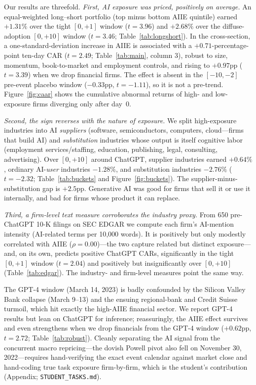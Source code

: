 \documentclass[12pt]{article}
\newcommand{\edgarnfirms}{650}\newcommand{\edgarcorr}{0.00}\newcommand{\edgarshare}{0}}
\begin{document}
Our results are threefold. \emph{First, AI exposure was priced, positively on average.}
An equal-weighted long--short portfolio (top minus bottom AIIE quintile) earned
$+1.31\%$ over the tight $[0,+1]$ window ($t=3.96$) and $+2.68\%$ over the
diffuse-adoption $[0,+10]$ window ($t=3.46$; Table~\ref{tab:longshort}). In the
cross-section, a one-standard-deviation increase in AIIE is associated with a
$+0.71$-percentage-point ten-day CAR ($t=2.49$; Table~\ref{tab:main}, column 3),
robust to size, momentum, book-to-market and employment controls, and rising to
$+0.97$pp ($t=3.39$) when we drop financial firms. The effect is absent in the
$[-10,-2]$ pre-event placebo window ($-0.33$pp, $t=-1.11$), so it is not a pre-trend.
Figure~\ref{fig:caar} shows the cumulative abnormal returns of high- and low-exposure
firms diverging only after day~0.

\emph{Second, the sign reverses with the nature of exposure.} We split high-exposure
industries into AI \emph{suppliers} (software, semiconductors, computers, cloud---firms
that build AI) and \emph{substitution} industries whose output is itself cognitive
labor (employment services/staffing, education, publishing, legal, consulting,
advertising). Over $[0,+10]$ around ChatGPT, supplier industries earned $+0.64\%$,
ordinary AI-\emph{user} industries $-1.28\%$, and substitution industries $-2.76\%$
($t=-2.32$; Table~\ref{tab:buckets} and Figure~\ref{fig:buckets}). The supplier-minus-
substitution gap is $+2.5$pp. Generative AI was good for firms that sell it or use it
internally, and bad for firms whose product it can replace.

\emph{Third, a firm-level text measure corroborates the industry proxy.} From
\edgarnfirms{} pre-ChatGPT 10-K filings on SEC EDGAR we compute each firm's AI-mention
intensity (AI-related terms per 10{,}000 words). It is positively but only modestly
correlated with AIIE ($\rho=\edgarcorr$)---the two capture related but distinct
exposure---and, on its own, predicts positive ChatGPT CARs, significantly in the tight
$[0,+1]$ window ($t=2.04$) and positively but insignificantly over $[0,+10]$
(Table~\ref{tab:edgar}). The industry- and firm-level measures point the same way.

The GPT-4 window (March 14, 2023) is badly confounded by the Silicon Valley Bank
collapse (March 9--13) and the ensuing regional-bank and Credit Suisse turmoil, which
hit exactly the high-AIIE financial sector. We report GPT-4 results but lean on ChatGPT
for inference; reassuringly, the AIIE effect survives and even strengthens when we drop
financials from the GPT-4 window ($+0.62$pp, $t=2.72$; Table~\ref{tab:robust}).
Cleanly separating the AI signal from the concurrent macro repricing---the dovish Powell
pivot also fell on November 30, 2022---requires hand-verifying the exact event calendar
against market close and hand-coding true task exposure firm-by-firm, which is the
student's contribution (Appendix; \texttt{STUDENT\_TASKS.md}).
\end{document}
